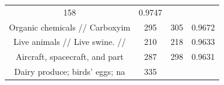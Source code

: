 \documentclass[10pt,]{article}
\begin{document}
\begin{longtable}[]{@{}cccc@{}}
\begin{minipage}[t]{0.20\columnwidth}
158\strut
\end{minipage} & \begin{minipage}[t]{0.09\columnwidth}\centering\strut
0.9747\strut
\end{minipage}\tabularnewline
\begin{minipage}[t]{0.38\columnwidth}\centering\strut
Organic chemicals // Carboxyim\strut
\end{minipage} & \begin{minipage}[t]{0.21\columnwidth}\centering\strut
295\strut
\end{minipage} & \begin{minipage}[t]{0.20\columnwidth}\centering\strut
305\strut
\end{minipage} & \begin{minipage}[t]{0.09\columnwidth}\centering\strut
0.9672\strut
\end{minipage}\tabularnewline
\begin{minipage}[t]{0.38\columnwidth}\centering\strut
Live animals // Live swine. //\strut
\end{minipage} & \begin{minipage}[t]{0.21\columnwidth}\centering\strut
210\strut
\end{minipage} & \begin{minipage}[t]{0.20\columnwidth}\centering\strut
218\strut
\end{minipage} & \begin{minipage}[t]{0.09\columnwidth}\centering\strut
0.9633\strut
\end{minipage}\tabularnewline
\begin{minipage}[t]{0.38\columnwidth}\centering\strut
Aircraft, spacecraft, and part\strut
\end{minipage} & \begin{minipage}[t]{0.21\columnwidth}\centering\strut
287\strut
\end{minipage} & \begin{minipage}[t]{0.20\columnwidth}\centering\strut
298\strut
\end{minipage} & \begin{minipage}[t]{0.09\columnwidth}\centering\strut
0.9631\strut
\end{minipage}\tabularnewline
\begin{minipage}[t]{0.38\columnwidth}\centering\strut
Dairy produce; birds' eggs; na\strut
\end{minipage} & \begin{minipage}[t]{0.21\columnwidth}\centering\strut
335\strut
\end{minipage} & \begin{minipage}[t]{0.20\columnwidth}\centering\strut

\end{minipage}
\end{longtable}
\end{document}
